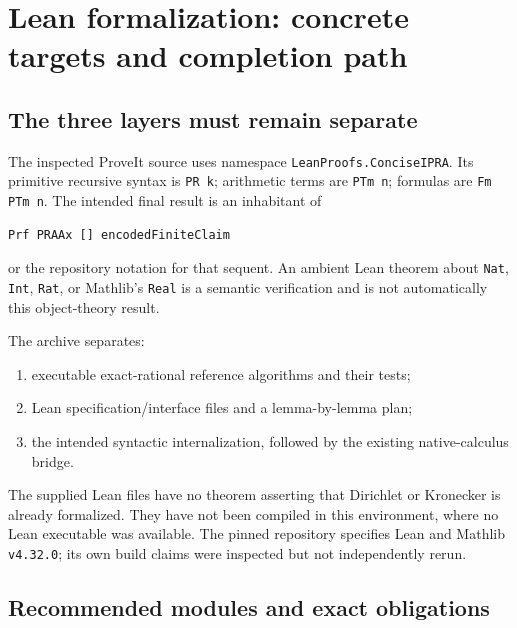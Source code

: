 \documentclass[11pt]{article}
\theoremstyle{definition}\newtheorem{definition}[theorem]{Definition}
\theoremstyle{remark}\newtheorem{remark}[theorem]{Remark}
\begin{document}
\section{Lean formalization: concrete targets and completion path}\label{sec:lean}

\subsection{The three layers must remain separate}

The inspected ProveIt source uses namespace \texttt{LeanProofs.ConciseIPRA}. Its primitive recursive syntax is \texttt{PR k}; arithmetic terms are \texttt{PTm n}; formulas are \texttt{Fm PTm n}. The intended final result is an inhabitant of
\begin{lstlisting}
Prf PRAAx [] encodedFiniteClaim
\end{lstlisting}
or the repository notation for that sequent. An ambient Lean theorem about \texttt{Nat}, \texttt{Int}, \texttt{Rat}, or Mathlib's \texttt{Real} is a semantic verification and is not automatically this object-theory result.

The archive separates:
\begin{enumerate}
\item executable exact-rational reference algorithms and their tests;
\item Lean specification/interface files and a lemma-by-lemma plan;
\item the intended syntactic internalization, followed by the existing native-calculus bridge.
\end{enumerate}
The supplied Lean files have no theorem asserting that Dirichlet or Kronecker is already formalized. They have not been compiled in this environment, where no Lean executable was available. The pinned repository specifies Lean and Mathlib \texttt{v4.32.0}; its own build claims were inspected but not independently rerun.

\subsection{Recommended modules and exact obligations}
\end{document}
